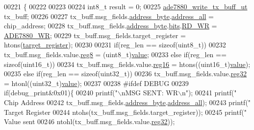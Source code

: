 \begin{DoxyCode}
00221                                                                                                            
            \{
00222       
00223       
00224     int8\_t result = 0;  
00225     \hyperlink{a00019}{ade7880\_write\_tx\_buff\_ut}  tx\_buff;
00226 
00227      tx\_buff.msg\_fields.\hyperlink{a00019_af6a65bac733ea3e9b1d24b065163d49a}{address\_byte}.\hyperlink{a00010_a7bf6defa0ae3fb2bca057a3a97d4f740}{address\_all} = chip\_address;
00228      tx\_buff.msg\_fields.\hyperlink{a00019_af6a65bac733ea3e9b1d24b065163d49a}{address\_byte}.\hyperlink{a00010_ae121725fb28cc26495969d71e0e0d42e}{bits}.\hyperlink{a00010_a97e2668c8e5470fa66185f16dc2e8045}{RD\_WR} = 
      \hyperlink{a00040_a36352e0d88dc7c5ede031013c75a678f}{ADE7880\_WR};
00229      tx\_buff.msg\_fields.target\_register = htons(\hyperlink{a00040_ac02048009fa6718e40f028b6bae63f3d}{target\_register});
00230      
00231     \textcolor{keywordflow}{if}(reg\_len == \textcolor{keyword}{sizeof}(uint8\_t))
00232       tx\_buff.msg\_fields.value.\hyperlink{a00019_a90b3f782e917edca7101e7803a3773b7}{reg8}  = (uint8\_t)\hyperlink{a00040_a638e4503e0ae6ce655b7ad2e17e8f0ad}{value};
00233     \textcolor{keywordflow}{else} \textcolor{keywordflow}{if}(reg\_len == \textcolor{keyword}{sizeof}(uint16\_t))
00234       tx\_buff.msg\_fields.value.\hyperlink{a00019_a0c22d234d52e616d449a8c264bf2030b}{reg16} = htons((uint16\_t)\hyperlink{a00040_a638e4503e0ae6ce655b7ad2e17e8f0ad}{value});
00235     \textcolor{keywordflow}{else} \textcolor{keywordflow}{if}(reg\_len == \textcolor{keyword}{sizeof}(uint32\_t))
00236       tx\_buff.msg\_fields.value.\hyperlink{a00019_a83e2be8d3feb1bcbc286bfaae10ac552}{reg32} = htonl((uint32\_t)\hyperlink{a00040_a638e4503e0ae6ce655b7ad2e17e8f0ad}{value});
00237     
00238 \textcolor{preprocessor}{    #ifdef DEBUG}
00239 \textcolor{preprocessor}{}      \textcolor{keywordflow}{if}(debug\_print&0x01)\{
00240        printf(\textcolor{stringliteral}{"\(\backslash\)nMSG SENT: WR\(\backslash\)n"});
00241        printf(\textcolor{stringliteral}{"       Chip Address %
00242        tx\_buff.msg\_fields.\hyperlink{a00019_af6a65bac733ea3e9b1d24b065163d49a}{address\_byte}.\hyperlink{a00010_a7bf6defa0ae3fb2bca057a3a97d4f740}{address\_all});
00243        printf(\textcolor{stringliteral}{"       Target Register %
00244        ntohs(tx\_buff.msg\_fields.target\_register));
00245        printf(\textcolor{stringliteral}{"       Value sent  %
00246        ntohl(tx\_buff.msg\_fields.value.\hyperlink{a00019_a83e2be8d3feb1bcbc286bfaae10ac552}{reg32}));
}}}
\end{DoxyCode}
